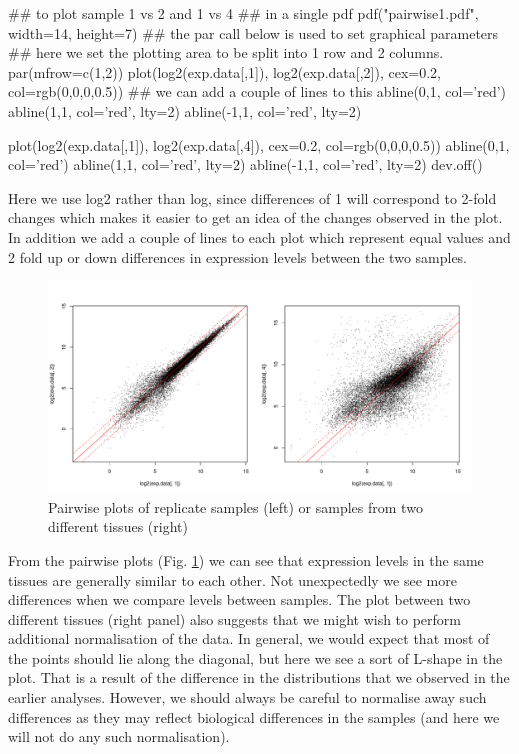 \documentclass[11pt]{article}
\begin{document}
\begin{rcode}
  ## to plot sample 1 vs 2 and 1 vs 4
  ## in a single pdf 
  pdf("pairwise1.pdf", width=14, height=7)
  ## the par call below is used to set graphical parameters
  ## here we set the plotting area to be split into 1 row and 2 columns.
  par(mfrow=c(1,2))
  plot(log2(exp.data[,1]), log2(exp.data[,2]), cex=0.2, col=rgb(0,0,0,0.5))
  ## we can add a couple of lines to this
  abline(0,1, col='red')
  abline(1,1, col='red', lty=2)
  abline(-1,1, col='red', lty=2)

  plot(log2(exp.data[,1]), log2(exp.data[,4]), cex=0.2, col=rgb(0,0,0,0.5))
  abline(0,1, col='red')
  abline(1,1, col='red', lty=2)
  abline(-1,1, col='red', lty=2)
  dev.off()
\end{rcode}

Here we use log2 rather than log, since differences of 1 will correspond to
2-fold changes which makes it easier to get an idea of the changes
observed in the plot. In addition we add a couple of lines to each plot
which represent equal values and 2 fold up or down differences in expression
levels between the two samples.

\begin{figure}[ht]
  \includegraphics[width=\textwidth]{images/pairwise1}
  \caption{Pairwise plots of replicate samples (left) or samples
    from two different tissues (right)}
  \label{pairwise}
\end{figure}

From the pairwise plots (Fig. \ref{pairwise}) we can see that expression levels
in the same tissues are generally similar to each other. Not 
unexpectedly we see more differences when we compare levels between samples.
The plot between two different tissues (right panel) also suggests that we
might wish to perform additional normalisation of the data. In general, we
would expect that most of the points should lie along the diagonal, but here we
see a sort of L-shape in the plot. That is a result of the difference in the
distributions that we observed in the earlier analyses. However, we should
always be careful to normalise away such differences as they may reflect
biological differences in the samples (and here we will not do any such
normalisation).
\end{document}
